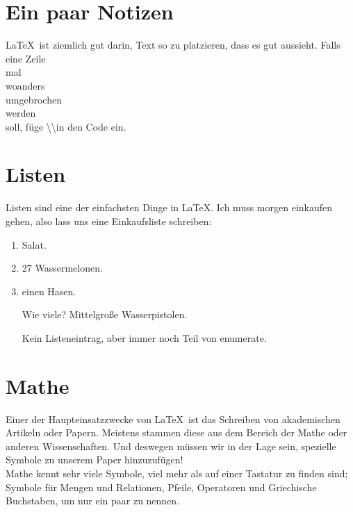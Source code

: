 \documentclass[12pt]{article}
\begin{document}
\section{Ein paar Notizen}
\LaTeX\ ist ziemlich gut darin, Text so zu platzieren, dass es gut aussieht.
Falls eine Zeile \\ mal \\ woanders \\ umgebrochen \\ werden \\ soll, füge
\textbackslash\textbackslash in den Code ein.\\

\section{Listen}
Listen sind eine der einfachsten Dinge in \LaTeX. Ich muss morgen einkaufen gehen,
also lass uns eine Einkaufsliste schreiben:
\begin{enumerate} %
  \item Salat.
  \item 27 Wassermelonen.
  \item einen Hasen.
  \item[Wie viele?] Mittelgroße Wasserpistolen.

  Kein Listeneintrag, aber immer noch Teil von enumerate.

\end{enumerate} %

\section{Mathe}

Einer der Haupteinsatzzwecke von \LaTeX\ ist das Schreiben von akademischen
Artikeln oder Papern. Meistens stammen diese aus dem Bereich der Mathe oder
anderen Wissenschaften. Und deswegen müssen wir in der Lage sein, spezielle
Symbole zu unserem Paper hinzuzufügen! \\

Mathe kennt sehr viele Symbole, viel mehr als auf einer Tastatur zu finden sind;
Symbole für Mengen und Relationen, Pfeile, Operatoren und Griechische Buchstaben,
um nur ein paar zu nennen.\\
\end{document}
